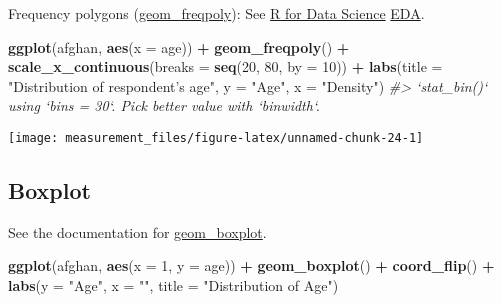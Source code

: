 \documentclass[]{book}
\newenvironment{Shaded}{\begin{snugshade}}{\end{snugshade}}
\newcommand{\KeywordTok}[1]{\textcolor[rgb]{0.13,0.29,0.53}{\textbf{#1}}}
\newcommand{\DataTypeTok}[1]{\textcolor[rgb]{0.13,0.29,0.53}{#1}}
\newcommand{\DecValTok}[1]{\textcolor[rgb]{0.00,0.00,0.81}{#1}}
\newcommand{\StringTok}[1]{\textcolor[rgb]{0.31,0.60,0.02}{#1}}
\newcommand{\CommentTok}[1]{\textcolor[rgb]{0.56,0.35,0.01}{\textit{#1}}}
\newcommand{\OperatorTok}[1]{\textcolor[rgb]{0.81,0.36,0.00}{\textbf{#1}}}
\newcommand{\NormalTok}[1]{#1}
\theoremstyle{definition}
\theoremstyle{definition}
\theoremstyle{definition}
\theoremstyle{remark}
\begin{document}
Frequency polygons
(\href{https://www.rdocumentation.org/packages/ggplot2/topics/geom_freqpoly}{geom\_freqpoly}):
See \href{http://r4ds.had.co.nz/}{R for Data Science}
\href{http://r4ds.had.co.nz/exploratory-data-analysis.html}{EDA}.

\begin{Shaded}
\begin{Highlighting}[]
\KeywordTok{ggplot}\NormalTok{(afghan, }\KeywordTok{aes}\NormalTok{(}\DataTypeTok{x =}\NormalTok{ age)) }\OperatorTok{+}
\StringTok{  }\KeywordTok{geom_freqpoly}\NormalTok{() }\OperatorTok{+}
\StringTok{  }\KeywordTok{scale_x_continuous}\NormalTok{(}\DataTypeTok{breaks =} \KeywordTok{seq}\NormalTok{(}\DecValTok{20}\NormalTok{, }\DecValTok{80}\NormalTok{, }\DataTypeTok{by =} \DecValTok{10}\NormalTok{)) }\OperatorTok{+}
\StringTok{  }\KeywordTok{labs}\NormalTok{(}\DataTypeTok{title =} \StringTok{"Distribution of respondent's age"}\NormalTok{,}
       \DataTypeTok{y =} \StringTok{"Age"}\NormalTok{, }\DataTypeTok{x =} \StringTok{"Density"}\NormalTok{)}
\CommentTok{#> `stat_bin()` using `bins = 30`. Pick better value with `binwidth`.}
\end{Highlighting}
\end{Shaded}

\begin{center}\texttt{[image: measurement\_files/figure-latex/unnamed-chunk-24-1]} \end{center}

\subsection{Boxplot}\label{boxplot}

See the documentation for
\href{https://www.rdocumentation.org/packages/ggplot2/topics/geom_boxplot}{geom\_boxplot}.

\begin{Shaded}
\begin{Highlighting}[]
\KeywordTok{ggplot}\NormalTok{(afghan, }\KeywordTok{aes}\NormalTok{(}\DataTypeTok{x =} \DecValTok{1}\NormalTok{, }\DataTypeTok{y =}\NormalTok{ age)) }\OperatorTok{+}
\StringTok{  }\KeywordTok{geom_boxplot}\NormalTok{() }\OperatorTok{+}
\StringTok{  }\KeywordTok{coord_flip}\NormalTok{() }\OperatorTok{+}
\StringTok{  }\KeywordTok{labs}\NormalTok{(}\DataTypeTok{y =} \StringTok{"Age"}\NormalTok{, }\DataTypeTok{x =} \StringTok{""}\NormalTok{, }\DataTypeTok{title =} \StringTok{"Distribution of Age"}\NormalTok{)}
\end{Highlighting}
\end{Shaded}
\end{document}
